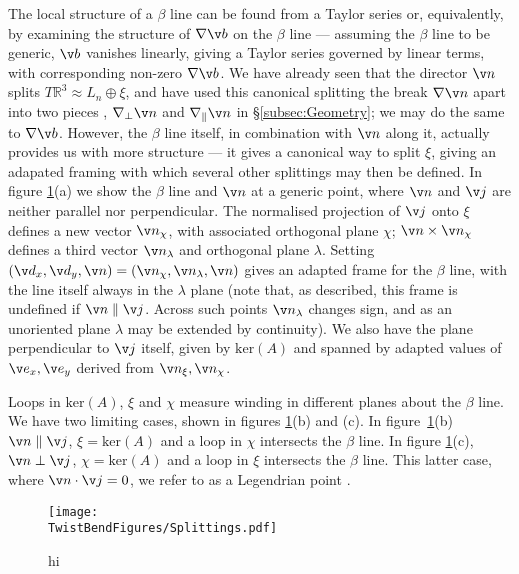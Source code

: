 The local structure of a $\beta$ line can be found from a Taylor series or, equivalently, by examining the structure of $\nabla \v b$ on the $\beta$ line --- assuming the $\beta$ line to be generic, $\v b$ vanishes linearly, giving a Taylor series governed by linear terms, with corresponding  non-zero $\nabla \v b$. We  have already seen that the director $\v n$ splits $T \mathbb{R}^3\approx L_n \oplus \xi$, and have used this canonical splitting the break $\nabla \v n$ apart into two pieces , $\nabla_\perp \v n $ and $\nabla_\parallel \v n$ in \S\ref{subsec:Geometry}; we may do the same to $\nabla \v b$. However, the $\beta$ line itself, in combination with $\v n$ along it, actually provides us with more structure --- it gives a canonical way to split $\xi$, giving an adapated framing with which several other splittings may then be defined. In figure \ref{fig:Splittings}(a) we show the $\beta$ line and $\v n$ at a generic point, where $\v n$ and $\v j$ are neither parallel nor perpendicular. The normalised projection of $\v j$ onto $\xi$ defines a new vector $\v n_\chi$, with associated orthogonal plane $\chi$; $\v n \times \v n_\chi$ defines a third vector $\v n_\lambda$ and orthogonal plane $\lambda$. Setting $(\v d_x, \v d_y, \v n) = (\v n_\chi, \v n_\lambda, \v n)$ gives an adapted frame for the $\beta$ line, with the line itself always in the $\lambda$ plane  (note that, as described, this frame is undefined if $\v n \parallel \v j$. Across such points $\v n_\lambda$ changes sign, and as an unoriented plane $\lambda$ may be extended by continuity). We also have the plane perpendicular to $\v j$ itself, given by $\mathrm{ker}(A)$ and spanned by adapted values of $\v e_x,\v e_y$ derived from $\v n_\xi, \v n_\chi$.  
 
Loops in $\mathrm{ker}(A)$, $\xi$ and $\chi$ measure winding in different planes about the $\beta$ line. We have two limiting cases, shown in figures \ref{fig:Splittings}(b) and (c). In figure~\ref{fig:Splittings}(b) $\v  n \parallel \v j$, $\xi = \mathrm{ker}(A)$ and a loop in $\chi$ intersects the $\beta$ line. In figure \ref{fig:Splittings}(c), $\v n \perp \v j$, $\chi = \mathrm{ker}(A)$ and a loop in $\xi$  intersects the $\beta$ line. This latter case, where $\v n \cdot \v j= 0$, we refer to as a Legendrian point \citep{Geiges}.
\begin{figure}[htbp]
    \centering
    \texttt{[image: \\TwistBendFigures/Splittings.pdf]}
    \caption{hi}
    \label{fig:Splittings}
\end{figure}

